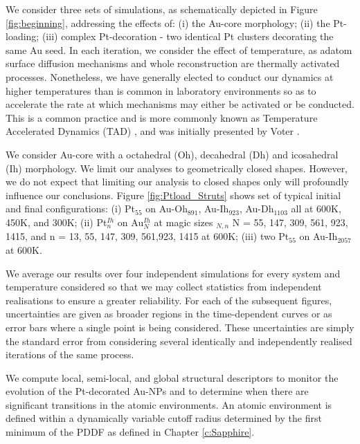 We consider three sets of simulations, as schematically depicted in Figure \ref{fig:beginning}, addressing the effects of: (i) the Au-core morphology; (ii) the Pt-loading; (iii) complex Pt-decoration - two identical Pt clusters decorating the same Au seed. In each iteration, we consider the effect of temperature, as adatom surface diffusion mechanisms and whole reconstruction are thermally activated processes. Nonetheless, we have generally elected to conduct our dynamics at higher temperatures than is common in laboratory environments \cite{Jorge2019,Jorge2021,JorgeStructure} so as to accelerate the rate at which mechanisms may either be activated or be conducted. This is a common practice and is more commonly known as Temperature Accelerated Dynamics (TAD) \cite{doi:10.1146/annurev-chembioeng-080615-033608}, and was initially presented by Voter \cite{PhysRevB.34.6819}. 
%

We consider Au-core with a octahedral (Oh), decahedral (Dh) and icosahedral (Ih) morphology. We limit our analyses to geometrically closed shapes. However, we do not expect that limiting our analysis to closed shapes only will profoundly influence our conclusions. Figure  \ref{fig:Ptload_Struts} shows set of typical initial and final configurations: (i) Pt$_{55}$ on Au-Oh$_{891}$, Au-Ih$_{923}$, Au-Dh$_{1103}$ all at 600K, 450K, and 300K; (ii) Pt$^{Ih}_{n}$ on Au$^{Ih}_{N}$ at magic sizes $_{N,n}$ N = 55, 147, 309, 561, 923, 1415, and n = 13, 55, 147, 309, 561,923, 1415 at 600K; (iii) two Pt$_{55}$ on Au-Ih$_{2057}$ at 600K.

We average our results over four independent simulations for every system and temperature considered so that we may collect statistics from independent realisations to ensure a greater reliability. For each of the subsequent figures, uncertainties are given as broader regions in the time-dependent curves or as error bars where a single point is being considered. These uncertainties are simply the standard error from considering several identically and independently realised iterations of the same process.

We compute local, semi-local, and global structural descriptors to monitor the evolution of the Pt-decorated Au-NPs and to determine when there are significant transitions in the atomic environments. An atomic environment is defined within a dynamically variable cutoff radius determined by the first minimum of the PDDF as defined in Chapter \ref{c:Sapphire}.

